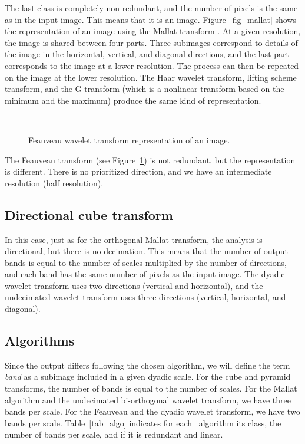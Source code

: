 The last class is completely non-redundant, and the number of pixels
 is the same as in the input image. This means that it is an image. 
Figure~\ref{fig_mallat}
shows the representation of an image using the Mallat transform \cite{wave:mallat89,wave:antonini92,wave:daube88}. At a 
given resolution, the image is shared between four parts. Three subimages
correspond to details of the image in the horizontal, vertical, and 
diagonal directions, and the last part corresponds to the image at a lower
resolution. The process can then be repeated on the image at the
lower resolution. The Haar wavelet transform, lifting scheme transform,
and the G transform (which is a nonlinear transform based on the minimum and 
the maximum) produce the same kind of representation.  

\begin{figure}[htb]
\centerline{
\hbox{
}}
\caption{Feauveau wavelet transform representation of an image.}
\label{fig_feauveau}
\end{figure}
The Feauveau transform \cite{wave:feauveau} (see Figure~\ref{fig_feauveau}) is not redundant, 
but the representation is different.
There is no prioritized direction, and we have an intermediate 
resolution (half resolution). 

\subsection*{Directional cube transform}
In this case, just as for the orthogonal Mallat transform, the 
analysis is directional, but there
is no decimation. This means that the number of output bands is equal to
the number of scales multiplied by the number of directions, and each band
has the same number 
of pixels as the input image. The dyadic wavelet transform
uses two directions (vertical and horizontal), and the undecimated 
wavelet transform uses three directions (vertical, horizontal, and diagonal).

\subsection*{Algorithms}
Since the output differs following the chosen algorithm, we will define
the term {\em band} as a subimage included in a given dyadic scale.
For the cube and pyramid transforms, the number of bands is equal to the 
number of scales. For the Mallat algorithm and the undecimated 
bi-orthogonal wavelet transform, we have three bands per scale.
For the Feauveau and the dyadic wavelet transform, we have two bands
per scale. Table~\ref{tab_algo} indicates for each \proj \ algorithm its
class, the number of bands per scale, and if it is redundant and linear.

